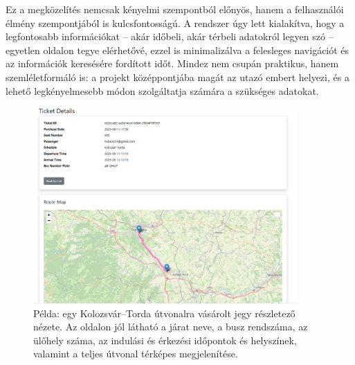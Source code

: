 Ez a megközelítés nemcsak kényelmi szempontból előnyös, hanem a felhasználói élmény szempontjából is kulcsfontosságú. A rendszer úgy lett kialakítva, hogy a legfontosabb információkat – akár időbeli, akár térbeli adatokról legyen szó – egyetlen oldalon tegye elérhetővé, ezzel is minimalizálva a felesleges navigációt és az információk keresésére fordított időt. Mindez nem csupán praktikus, hanem szemléletformáló is: a projekt középpontjába magát az utazó embert helyezi, és a lehető legkényelmesebb módon szolgáltatja számára a szükséges adatokat.

\begin{figure}[H]
    \centering
    \includegraphics[width=0.9\textwidth]{Szakdolgozat/Mellekletek/ticketdetail.PNG}
    \caption{Példa: egy Kolozsvár–Torda útvonalra vásárolt jegy részletező nézete. Az oldalon jól látható a járat neve, a busz rendszáma, az ülőhely száma, az indulási és érkezési időpontok és helyszínek, valamint a teljes útvonal térképes megjelenítése.}
    \label{fig:ticket-detail-kolozsvar-torda}
\end{figure}
